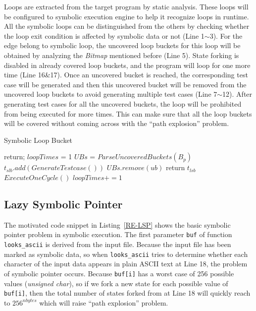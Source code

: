 Loops are extracted from the target program by static analysis. These loops will be configured to symbolic execution engine to help it recognize loops in runtime. All the symbolic loops can be distinguished from the others by checking whether the loop exit condition is affected by symbolic data or not (Line 1$\sim$3). For the edge belong to symbolic loop, the uncovered loop buckets for this loop will be obtained by analyzing the \textit{Bitmap} mentioned before (Line 5). 
State forking is disabled in already covered loop buckets, and the program will loop for one more time (Line 16\&17). Once an uncovered bucket is reached, the corresponding test case will be generated and then this uncovered bucket will be removed from the uncovered loop buckets to avoid generating multiple test cases (Line 7$\sim$12). After generating test cases for all the uncovered buckets, the loop will be prohibited from being executed for more times. This can make sure that all the loop buckets will be covered without coming across with the ``path explosion'' problem.

\begin{algorithm}
  \caption{Symbolic Loop Bucket}
  \label{SLB}
  {
    return;
  }
  $loopTimes$ = 1\;
  $UBs$ = $ParseUncoveredBuckets(B_p)$\;
  {
    {
      {
        $t_{slb}.add(GenerateTestcase())$\;
        $UBs$.$remove(ub)$\;
      }
    }
    {
      return $t_{lsb}$\;
    }{
      $ExecuteOneCycle()$\;
      $loopTimes += 1$\;
    }
  }
\end{algorithm}  

\subsection{Lazy Symbolic Pointer}
The motivated code snippet in Listing~\ref{RE-LSP} shows the basic symbolic pointer problem in symbolic execution. 
The first parameter \texttt{buf} of function \texttt{looks\_ascii} is derived from the input file. Because the input file has been marked as symbolic data, so when \texttt{looks\_ascii} tries to determine whether each character of the input data appears in plain ASCII text at Line 18, the problem of symbolic pointer occurs. Because \texttt{buf[i]} has a worst case of 256 possible values (\textit{unsigned char}), so if we fork a new state for each possible value of \texttt{buf[i]}, then the total number of states forked from at Line 18 will quickly reach to $256^{nbytes}$ which will raise ``path explosion'' problem.

